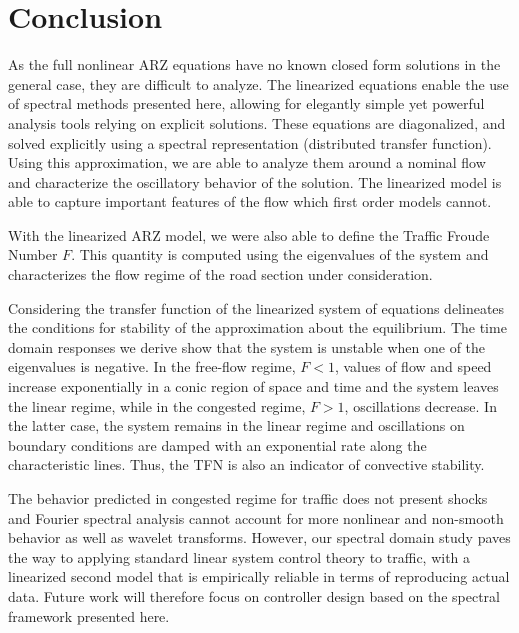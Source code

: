 \documentclass[5p,twocolumn]{elsarticle}
\begin{document}
\section{Conclusion}

As the full nonlinear ARZ equations have no known closed form solutions in the general case, they are difficult to analyze. The linearized equations enable the use of spectral methods presented here, allowing for elegantly simple yet powerful analysis tools relying on explicit solutions. These equations are diagonalized, and solved explicitly using a spectral representation (distributed transfer function). Using this approximation, we are able to analyze them around a nominal flow and characterize the oscillatory behavior of the solution. The linearized model is able to capture important features of the flow which first order models cannot. 

With the linearized ARZ model, we were also able to define the Traffic Froude Number $F$. This quantity is computed using the eigenvalues of the system and characterizes the flow regime of the road section under consideration.


Considering the transfer function of the linearized system of equations delineates the conditions for stability of the approximation about the equilibrium. The time domain responses we derive show that the system is unstable when one of the eigenvalues is negative. In the free-flow regime, $F < 1$, values of flow and speed increase exponentially in a conic region of space and time and the system leaves the linear regime, while in the congested regime, $F>1$, oscillations decrease. In the latter case, the system remains in the linear regime and oscillations on boundary conditions are damped with an exponential rate along the characteristic lines. Thus, the TFN is also an indicator of convective stability.

The behavior predicted in congested regime for traffic does not present shocks and Fourier spectral analysis cannot account for more nonlinear and non-smooth behavior as well as wavelet transforms. However, our spectral domain study paves the way to applying standard linear system control theory to traffic, with a linearized second model that is empirically reliable in terms of reproducing actual data. Future work will therefore focus on controller design based on the spectral framework presented here.
\end{document}
